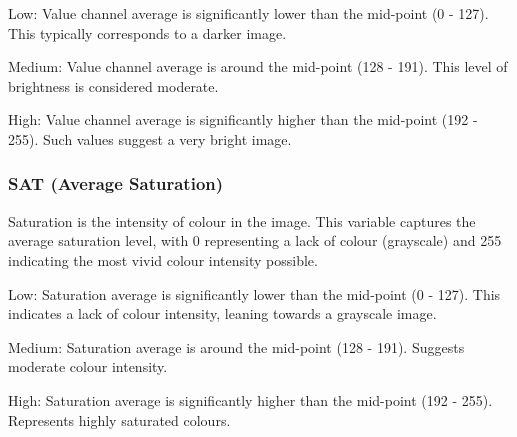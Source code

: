 \begin{description}[leftmargin=2.5cm, style=multiline, labelwidth=1.5cm]
\item[1] Low: Value channel average is significantly lower than the mid-point (0 - 127). This typically corresponds to a darker image.
\item[2] Medium: Value channel average is around the mid-point (128 - 191). This level of brightness is considered moderate.
\item[3] High: Value channel average is significantly higher than the mid-point (192 - 255). Such values suggest a very bright image.
\end{description}



\subsubsection*{SAT (Average Saturation)}
Saturation is the intensity of colour in the image. This variable captures the average saturation level, with 0 representing a lack of colour (grayscale) and 255 indicating the most vivid colour intensity possible.

\begin{description}[leftmargin=2.5cm, style=multiline, labelwidth=1.5cm]
\item[1] Low: Saturation average is significantly lower than the mid-point (0 - 127). This indicates a lack of colour intensity, leaning towards a grayscale image.
\item[2] Medium: Saturation average is around the mid-point (128 - 191). Suggests moderate colour intensity.
\item[3] High: Saturation average is significantly higher than the mid-point (192 - 255). Represents highly saturated colours.
\end{description}




